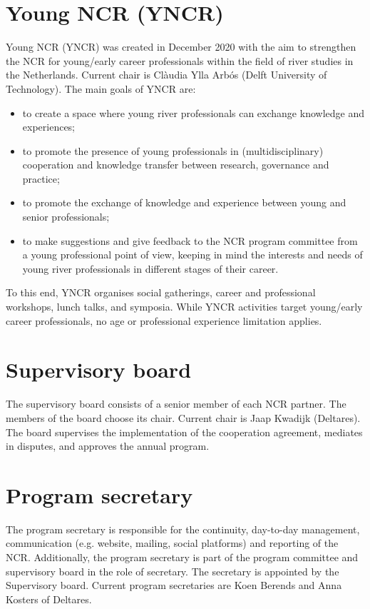     \section{Young NCR (YNCR)}
    Young NCR (YNCR) was created in December 2020 with the aim to strengthen the NCR for young/early career professionals within the field of river studies in the Netherlands. Current chair is Cl\`{a}udia {Ylla Arb\'{o}s} (Delft University of Technology). The main goals of YNCR are:
    \begin{itemize}
        \item to create a space where young river professionals can exchange knowledge and experiences;
        \item to promote the presence of young professionals in (multidisciplinary) cooperation and knowledge transfer between research, governance and practice;
        \item to promote the exchange of knowledge and experience between young and senior professionals;
        \item to make suggestions and give feedback to the NCR program committee from a young professional point of view, keeping in mind the interests and needs of young river professionals in different stages of their career.
    \end{itemize}
    To this end, YNCR organises social gatherings, career and professional workshops, lunch talks, and symposia. While YNCR activities target young/early career professionals, no age or professional experience limitation applies. \\
           
    \section{Supervisory board}
    The supervisory board consists of a senior member of each NCR partner. The members of the board choose its chair. Current chair is Jaap Kwadijk (Deltares). The board supervises the implementation of the cooperation agreement, mediates in disputes, and approves the annual program.\\ 
    
    \section{Program secretary}
    The program secretary is responsible for the continuity,  day-to-day management, communication (e.g. website, mailing, social platforms) and reporting of the NCR. Additionally, the program secretary is part of the program committee and supervisory board in the role of secretary. The secretary is appointed by the Supervisory board. Current program secretaries are Koen Berends and Anna Kosters of Deltares.

